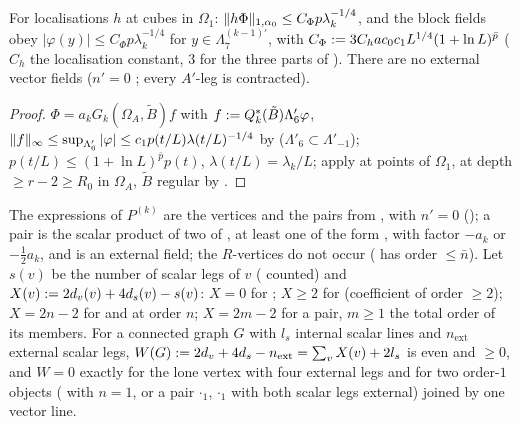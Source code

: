 \begin{lemma}\label{lem:a06f:C23}
For localisations $h$ at cubes in $\Omega_1$: $\lVert h\Phi\rVert_{1,\alpha_0}\le C_\Phi p\lambda_k^{-1/4}$, and the block fields \cite[(1.12)]{Ba3} obey $|\varphi(y)|\le C_\Phi p\lambda_k^{-1/4}$ for $y\in\Lambda^{(k-1)'}_7$, with $C_\Phi:=3C_hac_0c_1L^{1/4}(1+\ln L)^{\bar p}$ ($C_h$ the localisation constant, $3$ for the three parts of \cite[(1.32)]{Ba3}). There are no external vector fields ($n'=0$ \cite[p.~414]{Ba3}; every $A'$-leg is contracted).
\end{lemma}

\begin{proof}
$\Phi=a_kG_k(\Omega_A,\tilde B)f$ with $f:= Q_k^*(\tilde B)\Lambda'_6\varphi$, $\lVert f\rVert_\infty\le\sup_{\Lambda'_6}|\varphi|\le c_1p(t/L)\lambda(t/L)^{-1/4}$ by \cite[(2.55)]{Ba2} ($\Lambda'_6\subset\Lambda'_{-1}$); $p(t/L)\le(1+\ln L)^{\bar p}p(t)$, $\lambda(t/L)=\lambda_k/L$; apply \cite[(2.24)--(2.25)]{Ba1} at points of $\Omega_1$, at depth $\ge r-2\ge R_0$ in $\Omega_A$, $\tilde B$ regular by \cite[(2.60)]{Ba2}.
\end{proof}

\begin{lemma}\label{lem:a06f:C24}
The expressions of $P^{(k)}$ are the vertices \cite[(1.6), (1.7), (1.8), (1.10)]{Ba3} and the pairs from \cite[(1.12)--(1.14)]{Ba3}, with $n'=0$ (\cite[p.~414]{Ba3}); a pair is the scalar product of two of \cite[(1.12)--(1.14)]{Ba3}, at least one of the form \cite[(1.14)]{Ba3}, with factor $-a_k$ or $-\frac12a_k$, and \cite[(1.12)]{Ba3} is an external field; the $R$-vertices do not occur (\cite[(1.5)]{Ba3} has order $\le\bar n$). Let $s(v)$ be the number of scalar legs of $v$ (\cite[(1.12)]{Ba3} counted) and $X(v):=2d_v(v)+4d_s(v)-s(v)$: $X=0$ for \cite[(1.6)]{Ba3}; $X\ge2$ for \cite[(1.7)]{Ba3} (coefficient of order $\ge2$); $X=2n-2$ for \cite[(1.8)]{Ba3} and \cite[(1.10)]{Ba3} at order $n$; $X=2m-2$ for a pair, $m\ge1$ the total order of its \cite[(1.14)]{Ba3} members. For a connected graph $G$ with $l_s$ internal scalar lines and $n_{\mathrm{ext}}$ external scalar legs, $W(G):=2d_v+4d_s-n_{\mathrm{ext}}=\sum_vX(v)+2l_s$ is even and $\ge0$, and $W=0$ exactly for the lone \cite[(1.6)]{Ba3} vertex with four external legs and for two order-$1$ objects (\cite[(1.8)]{Ba3} with $n=1$, or a pair \cite[(1.12)]{Ba3}$\cdot$\cite[(1.14)]{Ba3}$_1$, \cite[(1.13)]{Ba3}$\cdot$\cite[(1.14)]{Ba3}$_1$ with both scalar legs external) joined by one vector line.
\end{lemma}


